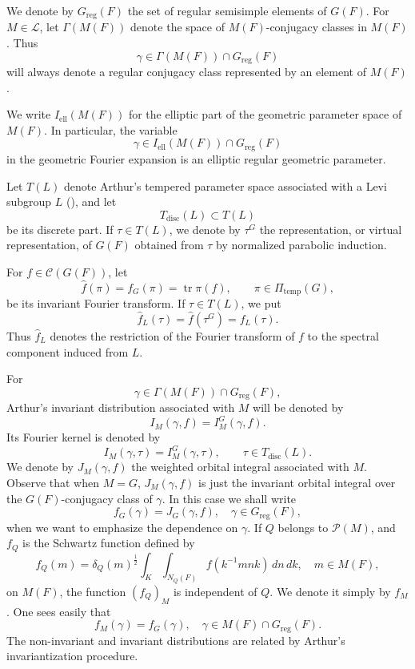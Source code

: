 \documentclass[11pt]{amsart}
\theoremstyle{definition}
\numberwithin{equation}{section}
\begin{document}
	
	We denote by \(G_{\mathrm{reg}}(F)\) the set of regular semisimple elements of \(G(F)\). For \(M\in\mathcal{L}\),
	let \(\Gamma(M(F))\) denote the space of \(M(F)\)-conjugacy classes in \(M(F)\). Thus
	\[
	\gamma\in \Gamma(M(F))\cap G_{\mathrm{reg}}(F)
	\]
	will always denote a regular conjugacy class represented by an element of
	\(M(F)\).
	
	We write
	\(I_{\mathrm{ell}}(M(F))\) for the elliptic part of the geometric parameter space of \(M(F)\). In
	particular, the variable
	\[
	\gamma\in I_{\mathrm{ell}}(M(F))\cap G_{\mathrm{reg}}(F)
	\]
	in the geometric Fourier expansion is an elliptic regular geometric
	parameter.
	
	Let \(T(L)\) denote Arthur's tempered parameter space associated with a Levi
	subgroup \(L\) (\cite{Art93}), and let
	\[
	T_{\mathrm{disc}}(L)\subset T(L)
	\]
	be its discrete part. If \(\tau\in T(L)\), we denote by
	\(\tau^G\) the representation, or virtual representation, of \(G(F)\) obtained from
	\(\tau\) by normalized parabolic induction.
	
	For \(f\in\mathcal C(G(F))\), let
	\[
	\widehat f(\pi)=f_G(\pi)=\operatorname{tr}\pi(f),
	\qquad
	\pi\in\Pi_{\mathrm{temp}}(G),
	\]
	be its invariant Fourier transform. If \(\tau\in T(L)\), we put
	\[
	\widehat f_L(\tau)
	=\widehat f(\tau^G)=f_L(\tau).
	\]
	Thus \(\widehat f_L\) denotes the restriction of the Fourier transform of
	\(f\) to the spectral component induced from \(L\).
	
	For
	\[
	\gamma\in\Gamma(M(F))\cap G_{\mathrm{reg}}(F),
	\]
	Arthur's invariant distribution associated with \(M\) will be denoted by
	\[
	I_M(\gamma,f)=I_M^G(\gamma,f).
	\]
	Its Fourier kernel is denoted by
	\[
	I_M(\gamma,\tau)
	=I_M^G(\gamma,\tau),
	\qquad
	\tau\in T_{\mathrm{disc}}(L).
	\]
	We denote by
	\(J_M(\gamma,f)\) the weighted orbital integral associated with \(M\). Observe that when \( M = G \), \( J_M(\gamma, f) \) is just the invariant orbital integral over the \( G(F) \)-conjugacy class of \( \gamma \). In this case we shall write
	\[
	f_G(\gamma) = J_G(\gamma, f), \quad \gamma \in G_{\mathrm{reg}}(F),
	\]
	when we want to emphasize the dependence on \( \gamma \). If \( Q \) belongs to \( \mathcal{P}(M) \), and \( f_Q \) is the Schwartz function defined by
	\[
	f_Q(m) = \delta_Q(m)^{\frac{1}{2}} \int_K \int_{N_Q(F)} f(k^{-1} m n k) \, dn \, dk, \quad m \in M(F),
	\]
	on \( M(F) \), the function \( (f_Q)_M \) is independent of \( Q \). We denote it simply by \( f_M \). One sees easily that
	\[
	f_M(\gamma) = f_G(\gamma), \quad \gamma \in M(F) \cap G_{\mathrm{reg}}(F).
	\]
	The
	non-invariant and invariant distributions are related by Arthur's
	invariantization procedure.
	
\end{document}
